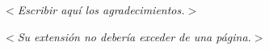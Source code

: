 \thispagestyle{empty}
\null\vfill

$<${\large \textit{Escribir aquí los agradecimientos.}}$>$

$<${\large \textit{Su extensión no debería exceder de una página.}}$>$
